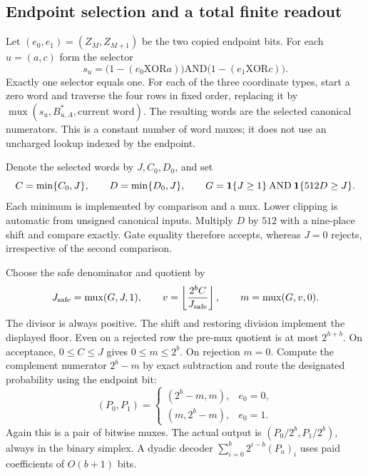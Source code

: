 \subsection{Endpoint selection and a total finite readout}
\label{sec:impl-readout}

Let $(e_0,e_1)=(Z_M,Z_{M+1})$ be the two copied endpoint bits. For each
$u=(a,c)$ form the selector
\[
 s_u=\bigl(1-(e_0\mathbin{\mathrm{XOR}}a)\bigr)
          \mathbin{\mathrm{AND}}
       \bigl(1-(e_1\mathbin{\mathrm{XOR}}c)\bigr).
\]
Exactly one selector equals one. For each of the three coordinate types,
start a zero word and traverse the four rows in fixed order, replacing
it by $\operatorname{mux}(s_u,B^*_{u,A},\text{current word})$.
The resulting words are the selected canonical numerators. This is a
constant number of word muxes; it does not use an uncharged lookup indexed
by the endpoint.

Denote the selected words by $J,C_0,D_0$, and set
\begin{equation}\label{eq:impl-clip-gate}
 C=\min\{C_0,J\},\qquad D=\min\{D_0,J\},\qquad
 G=\mathbf 1\{J\ge1\}\mathbin{\mathrm{AND}}\mathbf 1\{512D\ge J\}.
\end{equation}
Each minimum is implemented by comparison and a mux. Lower clipping is
automatic from unsigned canonical inputs. Multiply $D$ by $512$ with a
nine-place shift and compare exactly. Gate equality therefore accepts,
whereas $J=0$ rejects, irrespective of the second comparison.

Choose the safe denominator and quotient by
\begin{equation}\label{eq:impl-output}
 J_{\rm safe}=\operatorname{mux}(G,J,1),\qquad
 v=\left\lfloor\frac{2^bC}{J_{\rm safe}}\right\rfloor,\qquad
 m=\operatorname{mux}(G,v,0).
\end{equation}
The divisor is always positive. The shift and restoring division implement
the displayed floor. Even on a rejected row the pre-mux quotient is at
most $2^{h+b}$. On acceptance, $0\le C\le J$ gives $0\le m\le2^b$.
On rejection $m=0$. Compute the complement numerator $2^b-m$ by exact
subtraction and route the designated probability using the endpoint bit:
\begin{equation}\label{eq:impl-symbol-route}
 (P_0,P_1)=
 \begin{cases}
 (2^b-m,m),&e_0=0,\\
 (m,2^b-m),&e_0=1.
 \end{cases}
\end{equation}
Again this is a pair of bitwise muxes. The actual output is
$(P_0/2^b,P_1/2^b)$, always in the binary simplex. A dyadic decoder
$\sum_{i=0}^b 2^{i-b}(P_a)_i$ uses paid coefficients of $O(b+1)$ bits.

